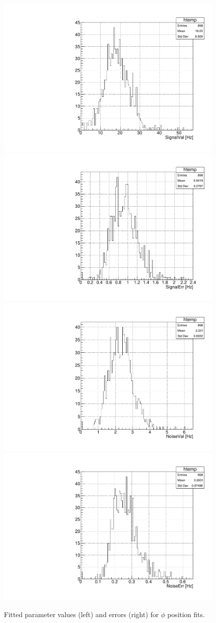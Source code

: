 \begin{figure}[h]
    \includegraphics[width=.4\linewidth]{plots/2018/PhiSignalVal.pdf}
    \includegraphics[width=.4\linewidth]{plots/2018/PhiSignalErr.pdf}\\
    \includegraphics[width=.4\linewidth]{plots/2018/PhiNoiseVal.pdf}
    \includegraphics[width=.4\linewidth]{plots/2018/PhiNoiseErr.pdf}
    \caption{Fitted parameter values (left) and errors (right) for $\phi$ position fits.}
    \label{fig:zfitpars}
\end{figure}
